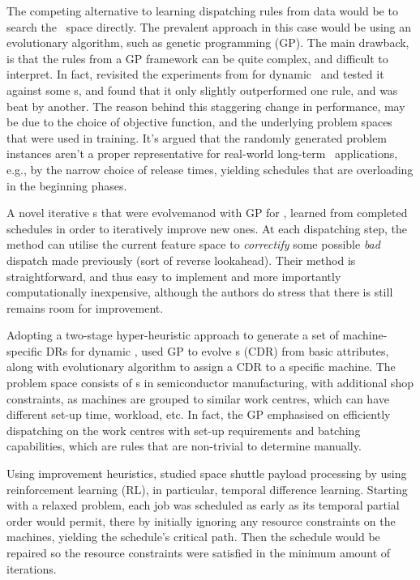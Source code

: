 \documentclass[smallextended]{svjour3}
\begin{document}
The competing alternative to learning dispatching rules from data would be to 
search the \dr\ space directly. The prevalent approach in this case would be 
using an evolutionary algorithm, such as genetic programming (GP).
The main drawback, is that the rules from a GP framework can be quite complex, 
and difficult to interpret.
In fact, \cite{Hildebrandt2010} revisited the experiments from \cite{Tay08} for 
dynamic \jsp\ and tested it against some \sdr s, and 
found that it only slightly outperformed one rule, and was beat by another. 
The reason behind this staggering change in performance, may be due to 
the choice of objective function, and the underlying problem spaces that were 
used in training.
It's argued that the randomly generated problem instances aren't a 
proper representative for real-world long-term \jsp\ applications, e.g., by the 
narrow choice of release times, yielding schedules that are overloading in the 
beginning phases.

A novel iterative \dr s that were evolvemanod with GP for \JSP, \cite{Nguyen13} 
learned from completed schedules in order to iteratively improve new ones. 
At each dispatching step, the method can utilise the current feature space to 
\emph{correctify} some possible \emph{bad} dispatch made previously (sort of 
reverse lookahead). Their method is straightforward, and thus easy to 
implement and more importantly computationally inexpensive, although the 
authors do stress that there is still remains room for improvement.

Adopting a two-stage hyper-heuristic approach to generate a set of 
machine-specific DRs for dynamic \jsp, \cite{Pickardt2013} used GP to evolve 
\cdr s (CDR) from basic attributes, along with evolutionary algorithm to assign 
a CDR to a specific machine. 
The problem space consists of \jsp s in semiconductor manufacturing, with 
additional shop constraints, as machines are grouped to similar work centres, 
which can have different set-up time, workload, etc. 
In fact, the GP emphasised on efficiently dispatching on the work 
centres with set-up requirements and batching capabilities, which are rules 
that are non-trivial to determine manually.


Using improvement heuristics, \cite{Zhang95} studied space shuttle payload 
processing by using reinforcement learning (RL), in particular, temporal 
difference learning. 
Starting with a relaxed problem, each job was scheduled as early as its 
temporal partial order would permit, there by initially ignoring any resource 
constraints on the machines, yielding the schedule's critical path. Then the 
schedule would be repaired so the resource constraints were satisfied in the 
minimum amount of iterations.
\end{document}
